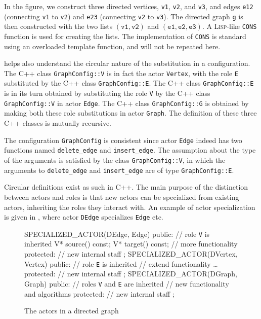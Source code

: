\documentclass[11pt]{article}
\numberwithin{figure}{section}
\newcommand\CC{\Lang{\mbox{C++}}\xspace}
\newcommand\Lang[1]{\textsc{#1}}
\newcommand{\cd}[1]{\texttt{#1}}
\begin{document}
In the figure, we construct three
    directed vertices, \cd{v1}, \cd{v2}, and \cd{v3},
    and edges \cd{e12} (connecting \cd{v1} to \cd{v2})
    and \cd{e23} (connecting \cd{v2} to \cd{v3}).
The directed graph \cd{g} is then constructed with the two lists $(\cd{v1}, \cd{v2})$
    and $(\cd{e1}, \cd{e2}, \cd{e3})$.
A \Lang{Lisp}-like \cd{CONS} function
    is used for creating the lists.
The implementation of \cd{CONS} is standard using an overloaded
    template function, and will not be repeated here.

 helps also
    understand the circular nature of the substitution in a configuration.
The \CC class \cd{GraphConfig::V} is in fact the
    actor \cd{Vertex}, with the role \cd{E} substituted by
    the \CC class \cd{GraphConfig::E}.
The \CC class \cd{GraphConfig::E} is in its turn
    obtained by substituting the role \cd{V} by the \CC class \cd{GraphConfig::V}
        in actor \cd{Edge}.
The \CC class \cd{GraphConfig::G} is obtained
    by making both these role substitutions in
    actor \cd{Graph}.
The definition of these three \CC classes
    is mutually recursive.

The configuration \cd{GraphConfig} is consistent since
    actor \cd{Edge} indeed has
    two functions named \cd{delete\_edge} and \cd{insert\_edge}.
The assumption about the type of the arguments is satisfied by the
    class \cd{GraphConfig::V}, in which the arguments to
    \cd{delete\_edge} and \cd{insert\_edge} are of type
    \cd{GraphConfig::E}.


Circular definitions exist as such in \CC{}.
The main purpose of the distinction between actors and roles is that
    new actors can be specialized from existing actors,
    inheriting the roles they interact with.
An example of actor specialization is given in ,
    where actor \cd{DEdge} specializes \cd{Edge} etc.

\begin{figure}[!htb]
\CPP
SPECIALIZED_ACTOR(DEdge, Edge) { public:
    //{} role \cd{V} is inherited
    V* source() const; V* target() const;
    // more functionality
    protected: //  new internal staff
};
SPECIALIZED_ACTOR(DVertex, Vertex) { public:
    //{} role \cd{E} is inherited
    //{} extend functionality \ldots
    protected: // new internal staff
};
SPECIALIZED_ACTOR(DGraph, Graph) { public:
    //{} roles \cd{V} and \cd{E} are inherited
    //{} new functionality and algorithms
    protected: // new internal staff
};
\END\PROGf{}
\caption{The actors in a directed graph}
\label{Figure:DGraph}
\end{figure} %
\end{document}
